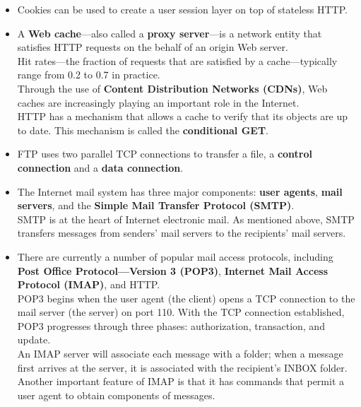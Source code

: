 \begin{itemize}
\item
Cookies can be used to create a user session layer on top of stateless HTTP.

\item
A \textbf{Web cache}---also called a \textbf{proxy server}---is a network entity that satisfies HTTP requests on the behalf of an origin Web server.\\
Hit rates---the fraction of requests that are satisfied by a cache---typically range from 0.2 to 0.7 in practice.\\
Through the use of \textbf{Content Distribution Networks (CDNs)}, Web caches are increasingly playing an important role in the Internet.\\
HTTP has a mechanism that allows a cache to verify that its objects are up to date. This mechanism is called the \textbf{conditional GET}.

\item
FTP uses two parallel TCP connections to transfer a file, a \textbf{control connection} and a \textbf{data connection}.

\item
The Internet mail system has three major components: \textbf{user agents}, \textbf{mail servers}, and the \textbf{Simple Mail Transfer Protocol (SMTP)}.\\
SMTP is at the heart of Internet electronic mail. As mentioned above, SMTP transfers messages from senders' mail servers to the recipients' mail servers.

\item
There are currently a number of popular mail access protocols, including \textbf{Post Office Protocol---Version 3 (POP3)}, \textbf{Internet Mail Access Protocol (IMAP)}, and HTTP.\\
POP3 begins when the user agent (the client) opens a TCP connection to the mail server (the server) on port 110. With the TCP connection established, POP3 progresses through three phases: authorization, transaction, and update.\\
An IMAP server will associate each message with a folder; when a message first arrives at the server, it is associated with the recipient's INBOX folder. Another important feature of IMAP is that it has commands that permit a user agent to obtain components of messages.


\end{itemize}
